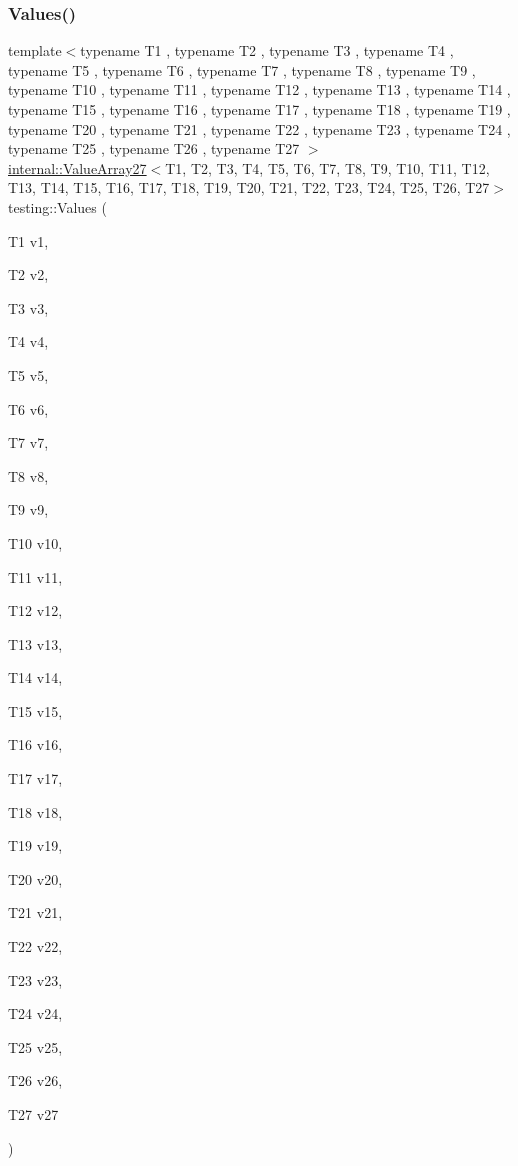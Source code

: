 \mbox{\label{namespacetesting_a089ea706f6cdde715d03ab42aa3099d3}} 
\subsubsection{\texorpdfstring{Values()}{Values()}\hspace{0.1cm}{\footnotesize\ttfamily [27/50]}}
{\footnotesize\ttfamily template$<$typename T1 , typename T2 , typename T3 , typename T4 , typename T5 , typename T6 , typename T7 , typename T8 , typename T9 , typename T10 , typename T11 , typename T12 , typename T13 , typename T14 , typename T15 , typename T16 , typename T17 , typename T18 , typename T19 , typename T20 , typename T21 , typename T22 , typename T23 , typename T24 , typename T25 , typename T26 , typename T27 $>$ \\
\mbox{\hyperlink{classtesting_1_1internal_1_1ValueArray27}{internal\+::\+Value\+Array27}}$<$T1, T2, T3, T4, T5, T6, T7, T8, T9, T10, T11, T12, T13, T14, T15, T16, T17, T18, T19, T20, T21, T22, T23, T24, T25, T26, T27$>$ testing\+::\+Values (\begin{DoxyParamCaption}\item[{T1}]{v1,  }\item[{T2}]{v2,  }\item[{T3}]{v3,  }\item[{T4}]{v4,  }\item[{T5}]{v5,  }\item[{T6}]{v6,  }\item[{T7}]{v7,  }\item[{T8}]{v8,  }\item[{T9}]{v9,  }\item[{T10}]{v10,  }\item[{T11}]{v11,  }\item[{T12}]{v12,  }\item[{T13}]{v13,  }\item[{T14}]{v14,  }\item[{T15}]{v15,  }\item[{T16}]{v16,  }\item[{T17}]{v17,  }\item[{T18}]{v18,  }\item[{T19}]{v19,  }\item[{T20}]{v20,  }\item[{T21}]{v21,  }\item[{T22}]{v22,  }\item[{T23}]{v23,  }\item[{T24}]{v24,  }\item[{T25}]{v25,  }\item[{T26}]{v26,  }\item[{T27}]{v27 }\end{DoxyParamCaption})}


